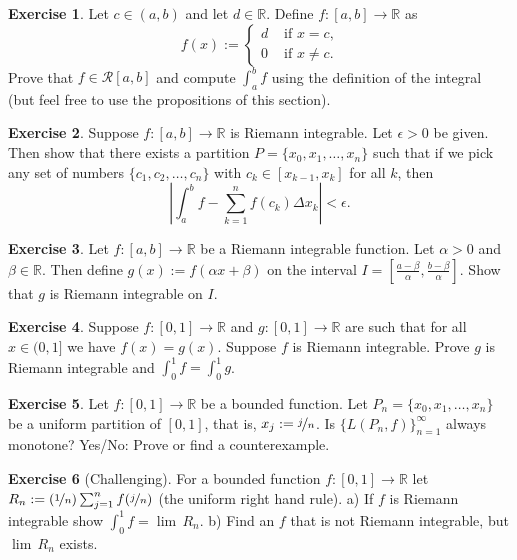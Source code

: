 \documentclass[12pt]{book}
\newcommand{\abs}[1]{\left\lvert {#1} \right\rvert}
\newcommand{\R}{{\mathbb{R}}}
\newcommand{\sR}{{\mathcal{R}}}
\theoremstyle{plain}
\theoremstyle{remark}
\theoremstyle{definition}
\theoremstyle{exercise}
\newtheorem{exercise}{Exercise}[section]
\theoremstyle{example}
\newcommand{\propref}[1]{\hyperref[#1]{Proposition~\ref*{#1}}}
\begin{document}
\begin{exercise}
Let $c \in (a,b)$ and let $d \in \R$.
Define $f \colon [a,b] \to \R$ as
\begin{equation*}
f(x) :=
\begin{cases}
d & \text{ if $x = c$,} \\
0 & \text{ if $x \not= c$.}
\end{cases}
\end{equation*}
Prove that $f \in \sR[a,b]$ and
compute
$\int_a^b f$ using the definition of the integral
(but
feel free to use the propositions of this section).
\end{exercise}

\begin{exercise} \label{exercise:taggedpartition}
Suppose $f \colon [a,b] \to \R$ is Riemann integrable.  Let $\epsilon
> 0$ be given.  Then show that there exists a partition $P = \{ x_0, x_1,
\ldots, x_n \}$
such that if we
pick any set of numbers $\{ c_1, c_2, \ldots, c_n \}$ with
$c_k \in [x_{k-1},x_k]$ for all $k$, then
\begin{equation*}
\abs{\int_a^b f - \sum_{k=1}^n f(c_k) \Delta x_k} < \epsilon .
\end{equation*}
\end{exercise}

\begin{exercise}
Let $f \colon [a,b] \to \R$ be a Riemann integrable function.
Let $\alpha > 0$ and $\beta \in \R$.
Then define $g(x) := f(\alpha x + \beta)$ on the interval
$I = [\frac{a-\beta}{\alpha}, \frac{b-\beta}{\alpha}]$.  Show
that $g$ is Riemann integrable on $I$.
\end{exercise}

\begin{exercise}
Suppose $f \colon [0,1] \to \R$ and $g \colon [0,1] \to \R$
are such that for all $x \in (0,1]$
we have $f(x) = g(x)$.  Suppose $f$ is Riemann integrable. 
Prove $g$ is Riemann integrable and $\int_{0}^1 f = \int_{0}^1 g$.
\end{exercise}

\begin{exercise}
Let $f \colon [0,1] \to \R$ be a bounded function.
Let $P_n = \{ x_0,x_1,\ldots,x_n \}$ be a uniform partition of $[0,1]$,
that is, $x_j := \nicefrac{j}{n}$.  Is $\{ L(P_n,f) \}_{n=1}^\infty$
always monotone?  Yes/No: Prove or find a counterexample.
\end{exercise}

\begin{exercise}[Challenging]
For a bounded function $f \colon [0,1] \to \R$ let
$R_n := (\nicefrac{1}{n})\sum_{j=1}^n f(\nicefrac{j}{n})$ (the
uniform right hand rule).
a) If $f$ is Riemann integrable show $\int_0^1 f = \lim \, R_n$.
b) Find an $f$ that is not Riemann integrable, but $\lim \, R_n$ exists.
\end{exercise}
\end{document}
